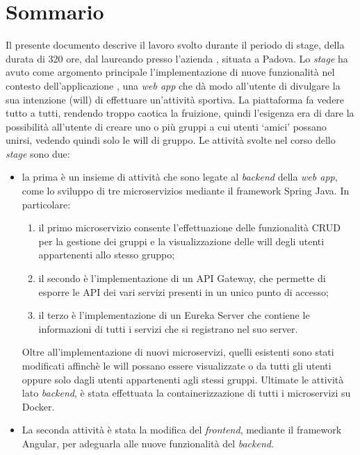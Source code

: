 
\cleardoublepage
{}
{}
\begingroup
\let\clearpage\relax
\let\cleardoublepage\relax
\let\cleardoublepage\relax

\chapter*{Sommario}

Il presente documento descrive il lavoro svolto durante il periodo di stage, della durata di 320 ore, dal laureando \myName\xspace presso
 l'azienda \myCompany, situata a Padova.
Lo \textit{stage} ha avuto come argomento principale l'implementazione di nuove funzionalità nel contesto dell'applicazione \productName, una
\textit{web app} che dà modo all'utente di divulgare la sua intenzione (\gls{will}) di effettuare un'attività sportiva.
La piattaforma fa vedere tutto a tutti, rendendo troppo caotica la fruizione, quindi l'esigenza era di dare la possibilità all'utente 
di creare uno o più gruppi a cui utenti \enquote*{amici} possano unirsi, vedendo quindi solo le \gls{will} di gruppo.
Le attività svolte nel corso dello \textit{stage} sono due:
\begin{itemize}
    \item la prima è un insieme di attività che sono legate al \textit{backend} della \textit{web app}, come lo sviluppo di tre \glspl{microservizio} mediante il \gls{framework} \gls{Spring} Java. 
    In particolare: 
        \begin{enumerate}
            \item il primo microservizio consente l'effettuazione delle funzionalità \gls{CRUD} per la gestione dei gruppi e la visualizzazione delle \gls{will} 
            degli utenti appartenenti allo stesso gruppo;
            \item il secondo è l'implementazione di un \gls{API Gateway}, che permette di esporre le \gls{API} dei vari servizi presenti in un 
            unico punto di accesso;
            \item il terzo è l'implementazione di un \gls{Eureka Server} che contiene le informazioni di tutti i servizi che si registrano nel suo server.
        \end{enumerate}
    Oltre all'implementazione di nuovi microservizi, quelli esistenti sono stati modificati affinchè le \gls{will} possano
    essere visualizzate o da tutti gli utenti oppure solo dagli utenti appartenenti agli stessi gruppi. 
    Ultimate le attività lato \textit{backend}, è stata effettuata la \gls{containerizzazione} di tutti i microservizi su Docker.
    \item La seconda attività è stata la modifica del \textit{frontend}, mediante il framework \gls{Angular}, per adeguarla alle nuove funzionalità del \textit{backend}.
\end{itemize}
